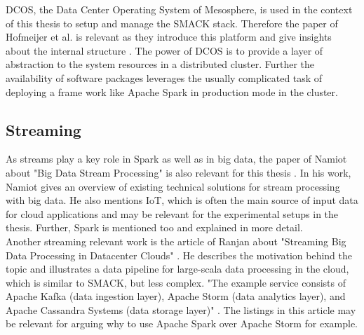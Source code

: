 DCOS, the Data Center Operating System of Mesosphere, is used in the context of this thesis to setup and manage the SMACK stack.
Therefore the paper of Hofmeijer et al. is relevant as they introduce this platform and give insights about the internal structure \cite{hofmeijer2004dcos}.
The power of DCOS is to provide a layer of abstraction to the system resources in a distributed cluster.
Further the availability of software packages leverages the usually complicated task of deploying a frame work like Apache Spark in production mode in the cluster.\\

\subsection{Streaming}
As streams play a key role in Spark as well as in big data, the paper of Namiot about "Big Data Stream Processing" is also relevant for this thesis \cite{namiot2015big}.
In his work, Namiot gives an overview of existing technical solutions for stream processing with big data.
He also mentions IoT, which is often the main source of input data for cloud applications and may be relevant for the experimental setups in the thesis.
Further, Spark is mentioned too and explained in more detail.\\

Another streaming relevant work is the article of Ranjan about "Streaming Big Data Processing in Datacenter Clouds" \cite{ranjan2014streaming}.
He describes the motivation behind the topic and illustrates a data pipeline for large-scala data processing in the cloud, which is similar to SMACK, but less complex.
"The example service consists of Apache Kafka (data ingestion layer), Apache Storm (data analytics layer), and Apache Cassandra Systems (data storage layer)" \cite{ranjan2014streaming}.
The listings in this article may be relevant for arguing why to use Apache Spark over Apache Storm for example.\\


